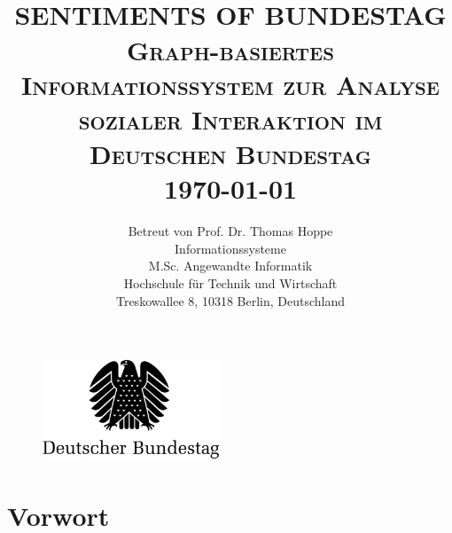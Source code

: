 \documentclass[a4paper,12pt,twoside]{book}
\title{
\HRule{0.5pt} \\
\LARGE \textbf{\uppercase{Sentiments of Bundestag}}
\HRule{2pt} \\ [0.5cm]
\normalsize \textsc{Graph-basiertes Informationssystem zur Analyse sozialer Interaktion im Deutschen Bundestag}
\\[2.0cm]
\normalsize \today
}
\author{
\normalsize Betreut von
\normalsize Prof. Dr. Thomas Hoppe\\
\normalsize Informationssysteme\\
\normalsize M.Sc. Angewandte Informatik\\
\normalsize Hochschule für Technik und Wirtschaft\\
\normalsize Treskowallee 8, 10318 Berlin, Deutschland\\
}
\makeatletter
\def\printtitle{	
    {\centering \@title\par}}
\def\printauthor{
    {\centering \large \@author}}
\makeatother
\begin{document}
\thispagestyle{empty}
\printtitle
  	\vfill
\begin{figure}[H]
    \centering
    \includegraphics[width=200px, keepaspectratio]{logos/bundestag.png}
\end{figure}
  	\vfill
\printauthor		
\newpage

\setcounter{page}{3}

\setcounter{tocdepth}{2}
\tableofcontents

\listoffigures

\listoftables

\setcounter{page}{6}

\chapter{Vorwort}


\end{document}
